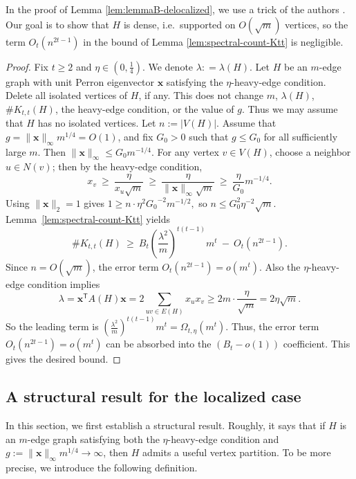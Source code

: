 \documentclass[11pt]{article}
\theoremstyle{definition}
\theoremstyle{plain}
\newcommand{\Ktt}{K_{t,t}}
\begin{document}
In the proof of Lemma \ref{lem:lemmaB-delocalized}, we use a trick of the authors \cite{LiLiuZhang2025EdgeSpectralESS}. 
Our goal is to show that $H$ is dense, i.e.~supported on \(O(\sqrt m)\) vertices, so the term $O_t(n^{2t-1})$ in the bound of Lemma \ref{lem:spectral-count-Ktt} is negligible. 

\begin{proof} 
Fix $t\ge 2$ and $\eta\in(0,\tfrac14)$. 
We denote $\lambda : =\lambda (H)$. 
Let $H$ be an $m$-edge graph with unit Perron eigenvector $\bm{x}$ satisfying the $\eta$-heavy-edge condition. 
Delete all isolated vertices of \(H\), if any. This does not change \(m\), \(\lambda(H)\), \(\texttt{\#}\Ktt(H)\), the heavy-edge condition, or the value of \(g\). Thus we may assume that \(H\) has no isolated vertices. Let \(n:=|V(H)|\).
Assume that $g=\|\bm{x}\|_\infty m^{1/4}=O(1)$, and fix $G_0>0$ such that $g\le G_0$ for all sufficiently large $m$.
Then $\| \bm{x}\|_\infty\le G_0 m^{-1/4}$. 
For any vertex $v\in V (H)$, choose a neighbor $u\in N(v)$; then by the heavy-edge condition,
\[
  x_v\ \ge\ \frac{\eta}{x_u\sqrt m}\ \ge\ \frac{\eta}{\| \bm{x}\|_\infty\sqrt m}\ \ge\ \frac{\eta}{G_0}m^{-1/4}.
\]
Using $\| \bm{x}\|_2=1$ gives  $1 \ge n \cdot {\eta}^2{G_0}^{-2} m^{-1/2},$ so $
 n \le {G_0^2}{\eta^{-2}}\sqrt m.$
Lemma~\ref{lem:spectral-count-Ktt} yields
\[
  \texttt{\#}\Ktt(H)
  \ \ge\
  B_t\left(\frac{\lambda^2}{m}\right)^{t(t-1)}m^t
  \ -\ O_t\!\left(n ^{2t-1}\right).
\]
Since $n=O(\sqrt m)$, the error term $O_t(n^{2t-1})= o(m^t)$.
Also the $\eta$-heavy-edge condition implies
\[ 
  \lambda =\bm{x}^{\mathsf T}A(H) \bm{x}
  =2\sum_{uv\in E(H)}x_u x_v
  \ge 2m\cdot \frac{\eta}{\sqrt m}
  =2\eta\sqrt m.
\] 
So the leading term is $\left(\frac{\lambda^2}{m}\right)^{t(t-1)}m^t=\Omega_{t,\eta}(m^t).$
Thus, the error term \(O_t(n^{2t-1})=o(m^t)\) can be absorbed into the $(B_t-o(1))$
coefficient. 
This gives the desired bound.
\end{proof}


\subsection{A structural result for the localized case}

In this section, we first establish a structural result. Roughly, it says that if $H$ is an $m$-edge graph satisfying both the $\eta$-heavy-edge condition and $g:=\|\bm{x}\|_{\infty} m^{1/4} \to \infty$,
then $H$ admits a useful vertex partition. 
To be more precise, we introduce the following definition. 
\end{document}
